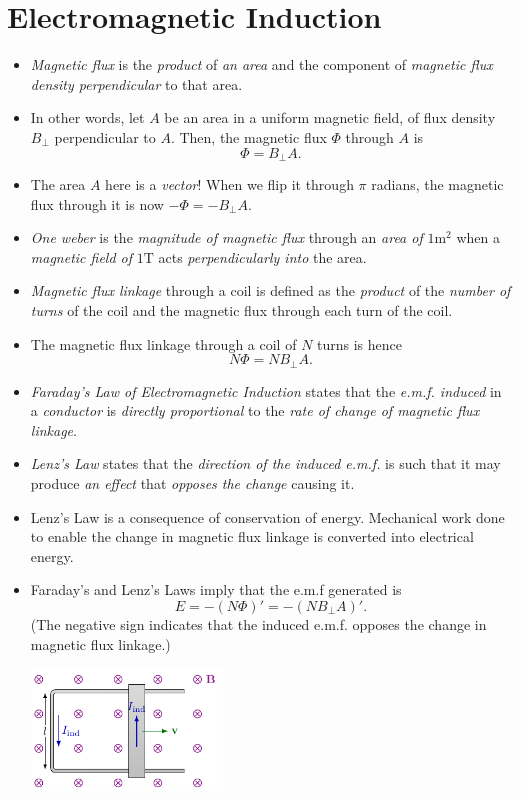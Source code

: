 \documentclass[oneside]{book}
\begin{document}
\chapter{Electromagnetic Induction}
\begin{itemize}
    \item \emph{Magnetic flux} is the \emph{product} of \emph{an area} and the component of \emph{magnetic flux density perpendicular} to that area.
    \item In other words, let \(A\) be an area in a uniform magnetic field, of flux density \(B_\perp\) perpendicular to \(A\). Then, the magnetic flux \(\Phi\) through \(A\) is
    \[\Phi=B_\perp A.\]
    \item The area \(A\) here is a \emph{vector}! When we flip it through \(\pi\) radians, the magnetic flux through it is now \(-\Phi=-B_\perp A\). 
    \item \emph{One weber} is the \emph{magnitude of magnetic flux} through an \emph{area of} \(1\text{m}^2\) when a \emph{magnetic field of} \(1\text{T}\) acts \emph{perpendicularly into} the area.
    \item \emph{Magnetic flux linkage} through a coil is defined as the \emph{product} of the \emph{number of turns} of the coil and the magnetic flux through each turn of the coil.
    \item The magnetic flux linkage through a coil of \(N\) turns is hence
    \[N\Phi=NB_\perp A.\]
    \item \emph{Faraday's Law of Electromagnetic Induction} states that the \emph{e.m.f. induced} in a \emph{conductor} is \emph{directly proportional} to the \emph{rate of change of magnetic flux linkage}.
    \item \emph{Lenz's Law} states that the \emph{direction of the induced e.m.f.} is such that it may produce \emph{an effect} that \emph{opposes the change} causing it.
    \item Lenz's Law is a consequence of conservation of energy. Mechanical work done to enable the change in magnetic flux linkage is converted into electrical energy.
    \item Faraday's and Lenz's Laws imply that the e.m.f generated is
    \[E=-(N\Phi)'=-(NB_\perp A)'.\]
    (The negative sign indicates that the induced e.m.f. opposes the change in magnetic flux linkage.)
    \begin{center}
        \includegraphics[width=0.4\textwidth,page=4]{../images/Lenz's-Law/Lenz's-Law.pdf}

\end{center}
\end{itemize}
\end{document}
